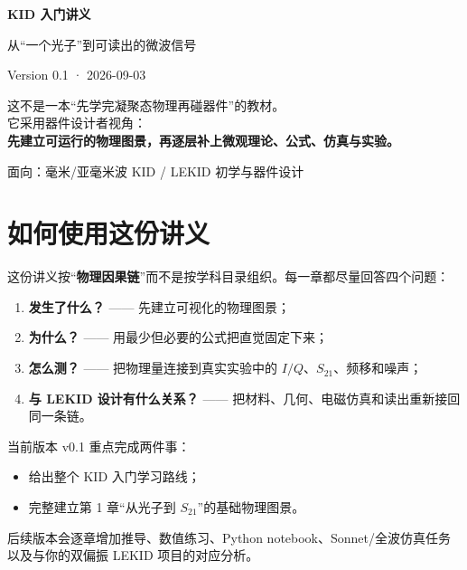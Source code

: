 \documentclass[11pt,a4paper,openany]{ctexrep}
\newcommand{\Stwentyone}{S_{21}}
\begin{document}
\begin{titlepage}
\centering
\vspace*{2.2cm}
{\fontsize{30}{38}\selectfont\bfseries\color{KidDark} KID 入门讲义}\par
\vspace{0.5cm}
{\Large\color{KidBlue} 从“一个光子”到可读出的微波信号}\par
\vspace{1.4cm}
{\large Version 0.1 · 2026-09-03}\par
\vfill
\begin{tcolorbox}[width=0.88\textwidth,colback=KidGray,colframe=KidBlue!55,arc=3mm]
\centering
\large
这不是一本“先学完凝聚态物理再碰器件”的教材。\\[0.5em]
它采用器件设计者视角：\\[0.3em]
\textbf{先建立可运行的物理图景，再逐层补上微观理论、公式、仿真与实验。}
\end{tcolorbox}
\vfill
{\large 面向：毫米/亚毫米波 KID / LEKID 初学与器件设计}\par
\end{titlepage}

\tableofcontents
\clearpage

\chapter*{如何使用这份讲义}
这份讲义按“\textbf{物理因果链}”而不是按学科目录组织。每一章都尽量回答四个问题：
\begin{enumerate}
  \item \textbf{发生了什么？} —— 先建立可视化的物理图景；
  \item \textbf{为什么？} —— 用最少但必要的公式把直觉固定下来；
  \item \textbf{怎么测？} —— 把物理量连接到真实实验中的 $I/Q$、$\Stwentyone$、频移和噪声；
  \item \textbf{与 LEKID 设计有什么关系？} —— 把材料、几何、电磁仿真和读出重新接回同一条链。
\end{enumerate}

当前版本 v0.1 重点完成两件事：
\begin{itemize}
  \item 给出整个 KID 入门学习路线；
  \item 完整建立第 1 章“从光子到 $\Stwentyone$”的基础物理图景。
\end{itemize}
后续版本会逐章增加推导、数值练习、Python notebook、Sonnet/全波仿真任务以及与你的双偏振 LEKID 项目的对应分析。
\end{document}
